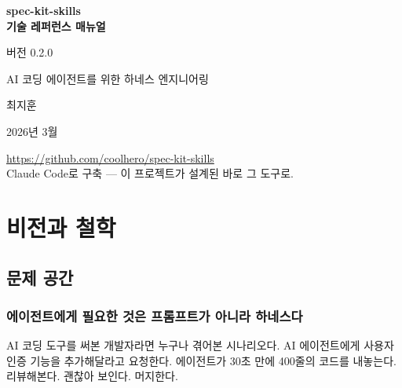 \documentclass[11pt,a4paper,openright,twoside]{report}
\begin{document}
\begin{titlepage}
\centering
\vspace*{3cm}

{\Huge\bfseries\color{specblue} spec-kit-skills\\[6pt]
기술 레퍼런스 매뉴얼}

\vspace{1.2cm}
{\Large 버전 0.2.0}

\vspace{0.8cm}
{\large AI 코딩 에이전트를 위한 하네스 엔지니어링}

\vspace{3cm}
{\Large 최지훈}

\vspace{0.5cm}
{\large 2026년 3월}

\vfill
{\small
\url{https://github.com/coolhero/spec-kit-skills}\\[4pt]
Claude Code로 구축 --- 이 프로젝트가 설계된 바로 그 도구로.
}
\end{titlepage}

\tableofcontents
\listoftables

\setcounter{page}{1}

\part{비전과 철학}

\chapter{문제 공간}
\label{ch:problem}

\section{에이전트에게 필요한 것은 프롬프트가 아니라 하네스다}

AI 코딩 도구를 써본 개발자라면 누구나 겪어본 시나리오다. AI 에이전트에게 사용자 인증 기능을 추가해달라고 요청한다. 에이전트가 30초 만에 400줄의 코드를 내놓는다. 리뷰해본다. 괜찮아 보인다. 머지한다.
\end{document}
